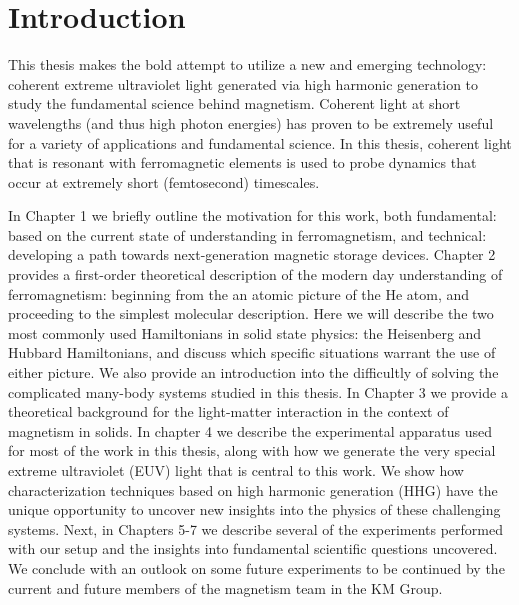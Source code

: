 \chapter{Introduction}
\label{introchap}

This thesis makes the bold attempt to utilize a new and emerging technology: coherent extreme ultraviolet light generated via high harmonic generation to study the fundamental science behind magnetism. Coherent light at short wavelengths (and thus high photon energies) has proven to be extremely useful for a variety of applications and fundamental science. In this thesis, coherent light that is resonant with ferromagnetic elements is used to probe dynamics that occur at extremely short (femtosecond) timescales.

In Chapter 1 we briefly outline the motivation for this work, both fundamental: based on the current state of understanding in ferromagnetism, and technical: developing a path towards next-generation magnetic storage devices. Chapter 2 provides a first-order theoretical description of the modern day understanding of ferromagnetism: beginning from the an atomic picture of the He atom, and proceeding to the simplest molecular description. Here we will describe the two most commonly used Hamiltonians in solid state physics: the Heisenberg and Hubbard Hamiltonians, and discuss which specific situations warrant the use of either picture. We also provide an introduction into the difficultly of solving the complicated many-body systems studied in this thesis. In Chapter 3 we provide a theoretical background for the light-matter interaction in the context of magnetism in solids. In chapter 4 we describe the experimental apparatus used for most of the work in this thesis, along with how we generate the very special extreme ultraviolet (EUV) light that is central to this work. We show how characterization techniques based on high harmonic generation (HHG) have the unique opportunity to uncover new insights into the physics of these challenging systems. Next, in Chapters 5-7 we describe several of the experiments performed with our setup and the insights into fundamental scientific questions uncovered. We conclude with an outlook on some future experiments to be continued by the current and future members of the magnetism team in the KM Group.


